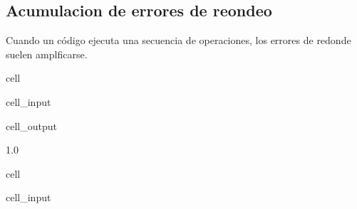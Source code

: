 \documentclass[letterpaper,10pt,english]{jupyterBook}
\begin{document}
\subsection{Acumulacion de errores de reondeo}
\label{\detokenize{1.1-Aspectos_generales/1.1-Aspectos_generales:acumulacion-de-errores-de-reondeo}}
\sphinxAtStartPar
Cuando un código ejecuta una secuencia de operaciones, los errores de redonde suelen amplficarse.

\begin{sphinxuseclass}{cell}\begin{sphinxVerbatimInput}

\begin{sphinxuseclass}{cell_input}
\begin{sphinxVerbatim}[commandchars=\\\{\}]
    
\end{sphinxVerbatim}

\end{sphinxuseclass}\end{sphinxVerbatimInput}
\begin{sphinxVerbatimOutput}

\begin{sphinxuseclass}{cell_output}
\begin{sphinxVerbatim}[commandchars=\\\{\}]
1.0
\end{sphinxVerbatim}

\end{sphinxuseclass}\end{sphinxVerbatimOutput}

\end{sphinxuseclass}
\begin{sphinxuseclass}{cell}\begin{sphinxVerbatimInput}

\begin{sphinxuseclass}{cell_input}
\begin{sphinxVerbatim}[commandchars=\\\{\}]
 
      
    
       
          

       
          
     
\end{sphinxVerbatim}

\end{sphinxuseclass}\end{sphinxVerbatimInput}

\end{sphinxuseclass}
\end{document}
